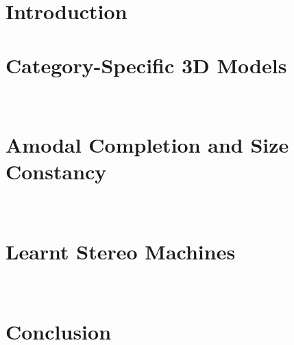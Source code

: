 \documentclass[12pt, oneside]{lib/ucthesis}
\def\ssp{\def\baselinestretch{1.0}\large\normalsize}
\begin{document}
\tableofcontents

\begin{acknowledgements}
\thispagestyle{plain}
\end{acknowledgements}




\begin{dissertationText}
\chapter{Introduction}
	

\chapter{Category-Specific 3D Models}~\label{chapter:CategoryShapes}
	

\chapter{Amodal Completion and Size Constancy}~\label{chapter:Amodal}
	

\chapter{Learnt Stereo Machines}~\label{chapter:LSM}
	
	
\chapter{Conclusion}
	

\ssp
% 



% 	

\end{dissertationText}
\end{document}
